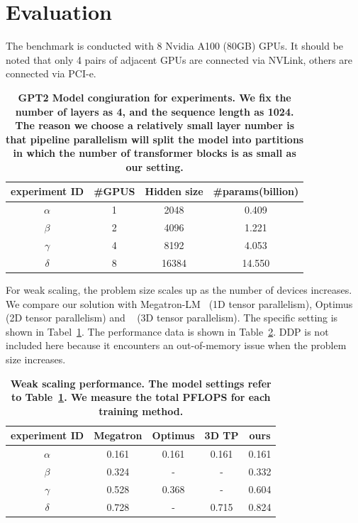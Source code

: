 \section{Evaluation}

The benchmark is conducted with 8 Nvidia A100 (80GB) GPUs. It should be noted that only 4 pairs of adjacent GPUs are connected via NVLink, others are connected via PCI-e. 

\begin{table}[h]
    \centering
    \begin{tabular}{|c|c|c|c|}
        \hline
        experiment ID & \#GPUS & Hidden size & \#params(billion)\\
        \hline
        $\alpha$ & 1 & 2048 & 0.409\\
        \hline
        $\beta$ & 2 & 4096 & 1.221\\
        \hline
        $\gamma$ &4 & 8192 & 4.053\\
        \hline
        $\delta$ & 8 & 16384 & 14.550\\
        \hline
    \end{tabular}
    \caption{\textbf{GPT2 Model congiuration for experiments. We fix the number of layers as 4, and the sequence length as 1024. The reason we choose a relatively small layer number is that pipeline parallelism will split the model into partitions in which the number of transformer blocks is as small as our setting.}}
    \label{tab:experiment setting}
    \vspace{-1.9em}
\end{table}

For weak scaling, the problem size scales up as the number of devices increases. We compare our solution with Megatron-LM~\cite{shoeybi2019megatron} (1D tensor parallelism), Optimus~\cite{https://doi.org/10.48550/arxiv.2104.05343} (2D tensor parallelism) and ~\cite{https://doi.org/10.48550/arxiv.2105.14450} (3D tensor parallelism). The specific setting is shown in Tabel~\ref{tab:experiment setting}. The performance data is shown in Table~\ref{tab: experiment performance}. DDP is not included here because it encounters an out-of-memory issue when the problem size increases.


\begin{table}[h]
    \centering
    \begin{tabular}{|c|c|c|c|c|}
        \hline
        experiment ID & Megatron & Optimus & 3D TP & ours\\
        \hline
        $\alpha$ & 0.161 & 0.161 & 0.161 & 0.161\\
        \hline
        $\beta$ & 0.324 & - & - & 0.332\\
        \hline
        $\gamma$ & 0.528 & 0.368 & - & 0.604\\
        \hline
        $\delta$ & 0.728 & - & 0.715 & 0.824\\
        \hline
    \end{tabular}
    \caption{\textbf{Weak scaling performance. The model settings refer to Table~\ref{tab:experiment setting}. We measure the total PFLOPS for each training method.}}
    \label{tab: experiment performance}
    \vspace{-2em}
\end{table}


